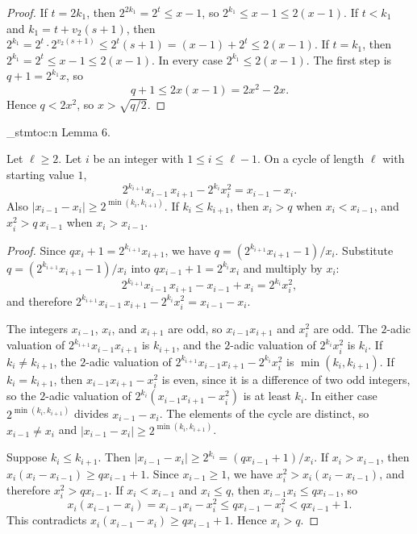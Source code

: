 \documentclass[11pt]{article}
\newenvironment{named}[1]{%
  \par\addvspace{\medskipamount}%
  \pagebreak[3]%
  \noindent{\bfseries #1}\space\ignorespaces
  \stmtoc{#1}%
}{\par\addvspace{\medskipamount}}
\newcommand{\stmtoc}[1]{ \qn_stmtoc:n {#1} }
\begin{document}
\begin{proof}
If $t = 2k_1$, then $2^{2k_1} = 2^t \le x - 1$, so $2^{k_1} \le x - 1 \le 2(x-1)$.
If $t < k_1$ and $k_1 = t + v_2(s+1)$, then $2^{k_1} = 2^t \cdot 2^{v_2(s+1)} \le 2^t(s+1) = (x-1) + 2^t \le 2(x-1)$.
If $t = k_1$, then $2^{k_1} = 2^t \le x - 1 \le 2(x-1)$.
In every case $2^{k_1} \le 2(x-1)$.
The first step is $q + 1 = 2^{k_1} x$, so
\[
q + 1 \le 2x(x-1) = 2x^2 - 2x.
\]
Hence $q < 2x^2$, so $x > \sqrt{q/2}$.
\end{proof}

\begin{named}{Lemma 6.}
Let $\ell \ge 2$.
Let $i$ be an integer with $1 \le i \le \ell - 1$.
On a cycle of length $\ell$ with starting value $1$,
\[
2^{k_{i+1}} x_{i-1}\, x_{i+1} - 2^{k_i} x_i^2 = x_{i-1} - x_i.
\]
Also $|x_{i-1} - x_i| \ge 2^{\min(k_i, k_{i+1})}$.
If $k_i \le k_{i+1}$, then $x_i > q$ when $x_i < x_{i-1}$, and $x_i^2 > q\, x_{i-1}$ when $x_i > x_{i-1}$.
\end{named}

\begin{proof}
Since $q x_i + 1 = 2^{k_{i+1}} x_{i+1}$, we have $q = (2^{k_{i+1}} x_{i+1} - 1)/x_i$.
Substitute $q = (2^{k_{i+1}} x_{i+1} - 1)/x_i$ into $q x_{i-1} + 1 = 2^{k_i} x_i$ and multiply by $x_i$:
\[
2^{k_{i+1}} x_{i-1}\, x_{i+1} - x_{i-1} + x_i = 2^{k_i} x_i^2,
\]
and therefore $2^{k_{i+1}} x_{i-1}\, x_{i+1} - 2^{k_i} x_i^2 = x_{i-1} - x_i$.

The integers $x_{i-1}$, $x_i$, and $x_{i+1}$ are odd, so $x_{i-1} x_{i+1}$ and $x_i^2$ are odd.
The $2$-adic valuation of $2^{k_{i+1}} x_{i-1} x_{i+1}$ is $k_{i+1}$, and the $2$-adic valuation of $2^{k_i} x_i^2$ is $k_i$.
If $k_i \ne k_{i+1}$, the $2$-adic valuation of $2^{k_{i+1}} x_{i-1} x_{i+1} - 2^{k_i} x_i^2$ is $\min(k_i, k_{i+1})$.
If $k_i = k_{i+1}$, then $x_{i-1} x_{i+1} - x_i^2$ is even, since it is a difference of two odd integers, so the $2$-adic valuation of $2^{k_i}(x_{i-1} x_{i+1} - x_i^2)$ is at least $k_i$.
In either case $2^{\min(k_i, k_{i+1})}$ divides $x_{i-1} - x_i$.
The elements of the cycle are distinct, so $x_{i-1} \ne x_i$ and $|x_{i-1} - x_i| \ge 2^{\min(k_i, k_{i+1})}$.

Suppose $k_i \le k_{i+1}$.
Then $|x_{i-1} - x_i| \ge 2^{k_i} = (q x_{i-1} + 1)/x_i$.
If $x_i > x_{i-1}$, then $x_i(x_i - x_{i-1}) \ge q x_{i-1} + 1$.
Since $x_{i-1} \ge 1$, we have $x_i^2 > x_i(x_i - x_{i-1})$, and therefore $x_i^2 > q x_{i-1}$.
If $x_i < x_{i-1}$ and $x_i \le q$, then $x_{i-1} x_i \le q x_{i-1}$, so
\[
x_i(x_{i-1} - x_i) = x_{i-1} x_i - x_i^2 \le q x_{i-1} - x_i^2 < q x_{i-1} + 1.
\]
This contradicts $x_i(x_{i-1} - x_i) \ge q x_{i-1} + 1$.
Hence $x_i > q$.
\end{proof}
\end{document}
